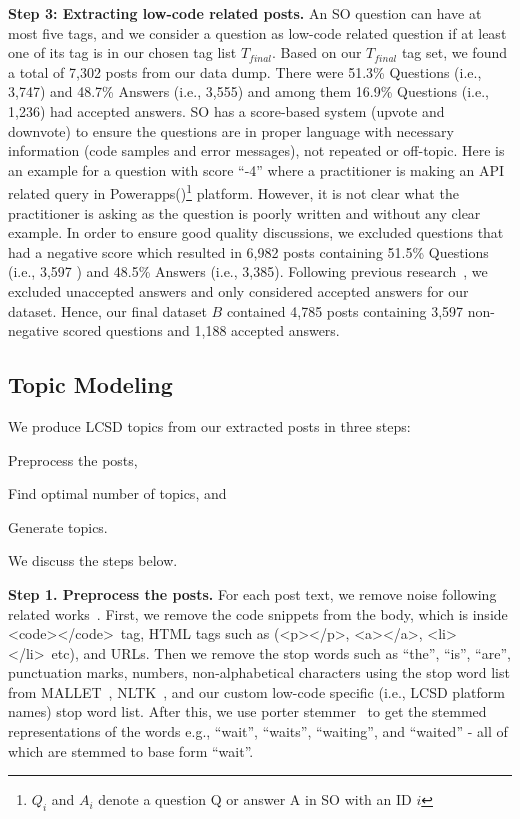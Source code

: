 \nd\textbf{Step 3: Extracting low-code related posts.}
An SO question can have at most five tags, and we consider a question as low-code related question if at least one of its tag is in our chosen tag list $T_{final}$. Based on our $T_{final}$ tag set, we found a total of 7,302 posts from our data dump. There were 51.3\% Questions (i.e., 3,747) and 48.7\% Answers (i.e., 3,555) and among them 16.9\% Questions (i.e., 1,236) had accepted answers. SO has a score-based system (upvote and downvote) to ensure the questions are in proper language with necessary information (code samples and error messages), not repeated or off-topic. Here is an example for a question with score ``-4'' where a practitioner is making an API related query in Powerapps()\footnote{$Q_i$ and $A_i$ denote a question Q or answer A in SO with an ID $i$} platform. However, it is not clear what the practitioner is asking as the question is poorly written and without any clear example. In order to ensure good quality discussions, we excluded questions that had a negative score which resulted in 6,982 posts containing 51.5\% Questions (i.e., 3,597 ) and 48.5\% Answers (i.e., 3,385). Following previous research~\cite{bagherzadeh2019going, rosen2016mobile, barua2014developers}, we excluded unaccepted answers and only considered accepted answers for our dataset. Hence, our final dataset $B$ contained  4,785 posts containing 3,597 non-negative scored questions and 1,188 accepted answers. 



\subsection{Topic Modeling} \label{topic_modeling}
We produce  LCSD topics from our extracted posts in three steps: \begin{inparaenum}[(1)]
\item Preprocess the posts, 
\item Find optimal number of topics, and
\item Generate topics.
\end{inparaenum} We discuss the steps below.

\nd\textbf{Step 1. Preprocess the posts.} For each post text, we remove noise following related works~\cite{abdellatif2020challenges,bagherzadeh2019going,barua2014developers}. First, we remove the code snippets from the body, which is inside \textless code\textgreater \textless /code\textgreater\ tag, HTML tags such as (\textless p\textgreater \textless /p\textgreater, \textless a\textgreater \textless /a\textgreater, \textless li\textgreater \textless /li\textgreater\ etc), and URLs. Then we remove the stop words such as ``the'', ``is'', ``are'', punctuation marks, numbers, non-alphabetical characters using the stop word list from MALLET~\cite{mccallum2002mallet}, NLTK~\cite{loper2002nltk}, and our custom low-code specific (i.e.,  LCSD platform names) stop word list. After this, we use porter stemmer~\cite{ramasubramanian2013effective} to get the stemmed representations of the words e.g., ``wait'', ``waits'', ``waiting'', and ``waited'' - all of which are stemmed to base form ``wait''.

